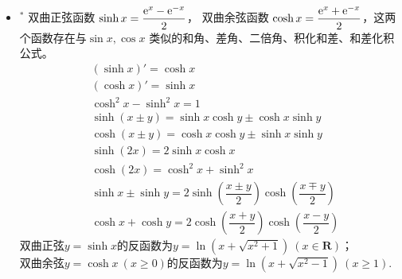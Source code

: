 \begin{itemize}[leftmargin=\inteval{\myitemleftmargin}pt,itemsep=
   \inteval{\myitemitempsep}pt,topsep=\inteval{\myitemtopsep}pt]
因为两个角的正、余弦的和(差)角公式，$ \sin $的数量等于$ \cos $
的数量，多个角的和与差展开，就是反复运用两个角的和与差展开，
所以$ \sin $的数量会始终等于等于$ \cos $的数量。
手工计算时可以利用这一性质进行快速检查，若发现数量不相等，
则肯定存在错误。

\item $^*$ 双曲正弦函数 $ \sinh x=\dfrac{\mathrm{e}^x-\mathrm{e}^{-x}}{2} $， 双曲余弦函数
$\cosh x=\dfrac{\mathrm{e}^x+\mathrm{e}^{-x}}{2} $，这两个函数存在与$ \sin x,\cos x $
类似的和角、差角、二倍角、积化和差、和差化积公式。
\begin{align*}
& (\sinh x)'=\cosh x\\
& (\cosh x)'=\sinh x \\
& \cosh^2 x-\sinh^2 x=1 \\
& \sinh(x\pm y)=\sinh x\cosh y\pm \cosh x\sinh y \\
& \cosh(x\pm y)=\cosh x\cosh y\pm \sinh x\sinh y \\
& \sinh(2x)=2\sinh x\cosh x \\
& \cosh(2x)=\cosh^2 x+\sinh^2 x \\
& \sinh x\pm \sinh y=2\sinh\left(\dfrac{x\pm y}{2}\right)
\cosh\left(\dfrac{x\mp y}{2}\right) \\
& \cosh x+\cosh y   =2\cosh\left(\dfrac{x+y}{2}\right)
\cosh\left(\dfrac{x-y}{2}\right) 
\end{align*}
双曲正弦$ y=\sinh x $的反函数为$ y=\ln(x+\sqrt{x^2+1})\ (x\in\textbf{R}) $；\\
双曲余弦$ y=\cosh x\ (x\geq 0) $的反函数为$ y=\ln(x+\sqrt{x^2-1})\ (x\geq 1) $.


\end{itemize}
